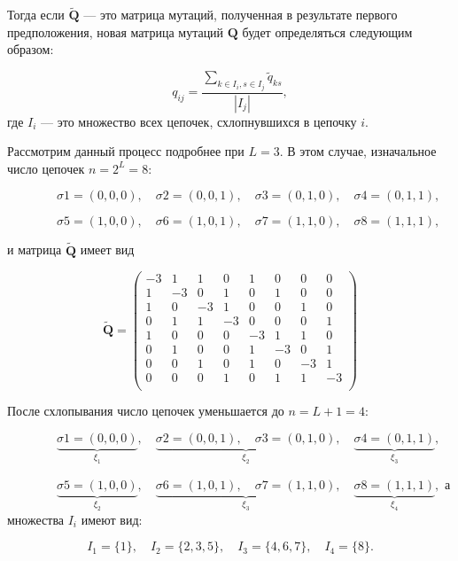 Тогда если $\tilde{\mathbf{Q}}$ --- это матрица мутаций, полученная в результате первого предположения, новая матрица мутаций $\mathbf{Q}$ будет определяться следующим образом:

\begin{equation}
q_{ij} = \dfrac {\sum\limits_{k \in {I}_{i}, s \in {I}_{j}}\tilde{q}_{ks}}{|I_{j}|},
\label{lr_eq8}
\end{equation}  
где $I_{i}$ --- это множество всех цепочек, схлопнувшихся в цепочку $i$.

Рассмотрим данный процесс подробнее при $L = 3$. В этом случае, изначальное число цепочек $n = 2^{L} = 8$:

$
\qquad \qquad \sigma{1} = (0, 0, 0), \quad \sigma{2} = (0, 0, 1), \quad \sigma{3} = (0, 1, 0), \quad \sigma{4} = (0, 1, 1),
$

$
\qquad \qquad  \sigma{5} = (1, 0, 0), \quad \sigma{6} = (1, 0, 1), \quad \sigma{7} = (1, 1, 0), \quad \sigma{8} = (1, 1, 1),
$

и матрица $\tilde{\mathbf{Q}}$ имеет вид

$$
\mathbf{\tilde{Q}} = 
\begin{pmatrix}
-3 & 1 & 1 & 0 & 1 & 0 & 0 & 0\\
1 & -3 & 0 & 1 & 0 & 1 & 0 & 0\\
1 & 0 & -3 & 1 & 0 & 0 & 1 & 0\\
0 & 1 & 1 & -3 & 0 & 0 & 0 & 1\\
1 & 0 & 0 & 0 & -3 & 1 & 1 & 0\\
0 & 1 & 0 & 0 & 1 & -3 & 0 & 1\\
0 & 0 & 1 & 0 & 1 & 0 & -3 & 1\\
0 & 0 & 0 & 1 & 0 & 1 & 1 & -3\\
\end{pmatrix}
$$

После схлопывания число цепочек уменьшается до $n = L + 1 = 4$:

$
\qquad \qquad \underbrace{\sigma{1} = (0, 0, 0)}_{\xi_{1}}, 
\quad \underbrace{\sigma{2} = (0, 0, 1), \quad \sigma{3} = (0, 1, 0)}_{\xi_{2}}, 
\quad \underbrace{\sigma{4} = (0, 1, 1)}_{\xi_{3}},
$

$
\qquad \qquad  \underbrace{\sigma{5} = (1, 0, 0)}_{\xi_{2}}, 
\quad \underbrace{\sigma{6} = (1, 0, 1), \quad \sigma{7} = (1, 1, 0)}_{\xi_{3}}, 
\quad \underbrace{\sigma{8} = (1, 1, 1)}_{\xi_{4}},
$
а множества ${I}_{i}$ имеют вид:

$$
I_{1} = \{1\}, \quad 
I_{2} = \{2, 3, 5\}, \quad 
I_{3} = \{4, 6, 7\}, \quad 
I_{4} = \{8\}.
$$

